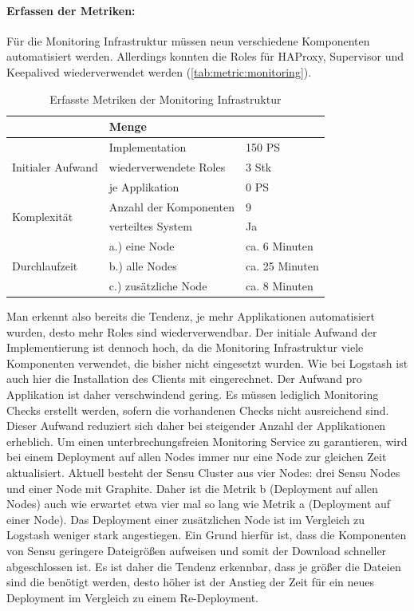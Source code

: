 \paragraph{Erfassen der Metriken:}
Für die Monitoring Infrastruktur müssen neun verschiedene Komponenten automatisiert werden. Allerdings konnten die Roles für HAProxy, Supervisor und Keepalived wiederverwendet werden (\autoref{tab:metric:monitoring}). 
\begin{table}[ht]
\setlength{\tabcolsep}{5pt}
\renewcommand{\arraystretch}{1.5}
\centering
\begin{tabular}{|l|l|l|}
\hline
\rowcolor[HTML]{C0C0C0}
\multicolumn{2}{|c|}{\textbf{Metrik}} & \textbf{Menge}					\\ 
\hline
\multirow{3}{*}{Initialer Aufwand}	& Implementation & 150 PS	\\ 
\cline{2-3}
									& wiederverwendete Roles & 3 Stk		\\
\cline{2-3}
									& je Applikation 		& 0 PS 	\\
\hline 
\multirow{2}{*}{Komplexität}			& Anzahl der Komponenten & 9 		\\
\cline{2-3}
									& verteiltes System		& Ja 		\\
\hline
\multirow{3}{*}{Durchlaufzeit} 		& a.) eine Node		& ca. 6 Minuten	\\ 
\cline{2-3} 
									& b.) alle Nodes		& ca. 25 Minuten	\\ 
\cline{2-3}							
									& c.) zusätzliche Node	& ca. 8 Minuten	\\
\hline
\end{tabular} 
\caption{Erfasste Metriken der Monitoring Infrastruktur}
\label{tab:metric:monitoring}
\end{table} 
Man erkennt also bereits die Tendenz, je mehr Applikationen automatisiert wurden, desto mehr Roles sind wiederverwendbar. Der initiale Aufwand der Implementierung ist dennoch hoch, da die Monitoring Infrastruktur viele Komponenten verwendet, die bisher nicht eingesetzt wurden. Wie bei Logstash ist auch hier die Installation des Clients mit eingerechnet. Der Aufwand pro Applikation ist daher verschwindend gering. Es müssen lediglich Monitoring Checks erstellt werden, sofern die vorhandenen Checks nicht ausreichend sind. Dieser Aufwand reduziert sich daher bei steigender Anzahl der Applikationen erheblich. Um einen unterbrechungsfreien Monitoring Service zu garantieren, wird bei einem Deployment auf allen Nodes immer nur eine Node zur gleichen Zeit aktualisiert. Aktuell besteht der Sensu Cluster aus vier Nodes: drei Sensu Nodes und einer Node mit Graphite. Daher ist die Metrik b (Deployment auf allen Nodes) auch wie erwartet etwa vier mal so lang wie Metrik a (Deployment auf einer Node). Das Deployment einer zusätzlichen Node ist im Vergleich zu Logstash weniger stark angestiegen. Ein Grund hierfür ist, dass die Komponenten von Sensu geringere Dateigrößen aufweisen und somit der Download schneller abgeschlossen ist. Es ist daher die Tendenz erkennbar, dass je größer die Dateien sind die benötigt werden, desto höher ist der Anstieg der Zeit für ein neues Deployment im Vergleich zu einem Re-Deployment.

